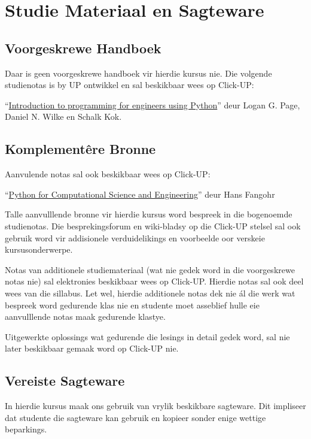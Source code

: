 \section{Studie Materiaal en Sagteware}
    \subsection{Voorgeskrewe Handboek}
        Daar is geen voorgeskrewe handboek vir hierdie kursus nie. Die volgende 
        studienotas is by UP ontwikkel en sal beskikbaar wees op Click-UP:
        
        ``\underline{Introduction to programming for engineers using Python}'' deur
        Logan G. Page, Daniel N. Wilke en Schalk Kok.
    
    \subsection{Komplement\^{e}re Bronne}
        Aanvulende notas sal ook beskikbaar wees op Click-UP:
            
        ``\underline{Python for Computational Science and Engineering}'' deur 
        Hans Fangohr
        
        Talle aanvulllende bronne vir hierdie kursus word bespreek in die
        bogenoemde studienotas.  Die besprekingsforum en wiki-bladsy
        op die Click-UP stelsel sal ook gebruik word vir addisionele
        verduidelikings en voorbeelde oor verskeie kursusonderwerpe. 
        
        Notas van additionele studiemateriaal (wat nie gedek word in die voorgeskrewe
        notas nie) sal elektronies beskikbaar wees op Click-UP. Hierdie 
        notas sal ook deel wees van die sillabus.  Let wel, hierdie additionele notas 
        dek nie \'{a}l die werk wat bespreek word gedurende klas nie en studente
        moet asseblief hulle eie aanvulllende notas maak gedurende klastye.
        
        Uitgewerkte oplossings wat gedurende die lesings in detail gedek word, sal nie
        later beskikbaar gemaak word op Click-UP nie.
        

    \subsection{Vereiste Sagteware}
	In hierdie kursus maak ons gebruik van vrylik beskikbare sagteware.
	Dit impliseer dat studente die sagteware kan gebruik en kopieer sonder
	enige wettige beparkings.


